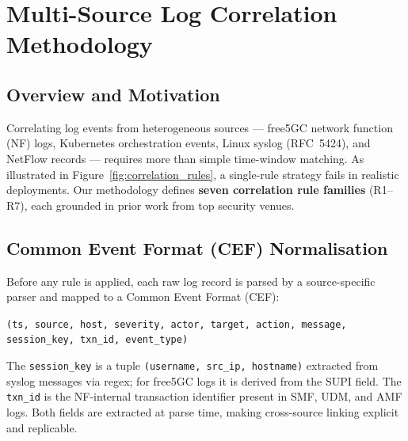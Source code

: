 
\usepackage{algorithm}
\usepackage{algpseudocode}
\usepackage{booktabs}
\usepackage{multirow}
\usepackage{xcolor}
\usepackage{tabularx}


\section{Multi-Source Log Correlation Methodology}
\label{sec:correlation}

\subsection{Overview and Motivation}

Correlating log events from heterogeneous sources — free5GC network
function (NF) logs, Kubernetes orchestration events, Linux syslog
(RFC~5424), and NetFlow records — requires more than simple time-window
matching. As illustrated in Figure~\ref{fig:correlation_rules}, a
single-rule strategy fails in realistic deployments. Our methodology
defines \textbf{seven correlation rule families} (R1–R7), each grounded
in prior work from top security venues.

\subsection{Common Event Format (CEF) Normalisation}
\label{sec:cef}

Before any rule is applied, each raw log record is parsed by a
source-specific parser and mapped to a Common Event Format (CEF):
\begin{center}
\texttt{(ts, source, host, severity, actor, target, action, message,
session\_key, txn\_id, event\_type)}
\end{center}
The \texttt{session\_key} is a tuple \texttt{(username, src\_ip, hostname)}
extracted from syslog messages via regex; for free5GC logs it is derived
from the SUPI field. The \texttt{txn\_id} is the NF-internal transaction
identifier present in SMF, UDM, and AMF logs. Both fields are extracted
at parse time, making cross-source linking explicit and replicable.

